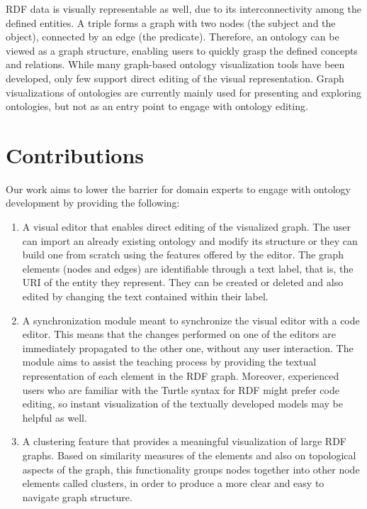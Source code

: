 RDF data is visually representable as well, due to its interconnectivity among the defined entities. A triple forms a graph with two nodes (the subject and the object), connected by an edge (the predicate). Therefore, an ontology can be viewed as a graph structure, enabling users to quickly grasp the defined concepts and relations. While many graph-based ontology visualization tools have been developed, only few support direct editing of the visual representation. Graph visualizations of ontologies are currently mainly used for presenting and exploring ontologies, but not as an entry point to engage with ontology editing. 


\section {Contributions}

Our work aims to lower the barrier for domain experts to engage with ontology development by providing the following:

\begin{enumerate}
	\item A visual editor that enables direct editing of the visualized graph. The user can import an already existing ontology and modify its structure or they can build one from scratch using the features offered by the editor. The graph elements (nodes and edges) are identifiable through a text label, that is, the URI of the entity they represent. They can be created or deleted and also edited by changing the text contained within their label.
	\item A synchronization module meant to synchronize the visual editor with a code editor. This means that the changes performed on one of the editors are immediately propagated to the other one, without any user interaction. The module aims to assist the teaching process by providing the textual representation of each element in the RDF graph. Moreover, experienced users who are familiar with the Turtle syntax for RDF might prefer code editing, so instant visualization of the textually developed models may be helpful as well.
	\item A clustering feature that provides a meaningful visualization of large RDF graphs. Based on similarity measures of the elements and also on topological aspects of the graph, this functionality groups nodes together into other node elements called clusters, in order to produce a more clear and easy to navigate graph structure.
\end{enumerate}


